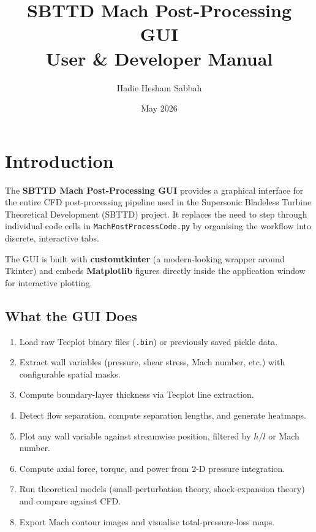 \documentclass[11pt,letterpaper]{article}
\title{%
  \vspace{-1cm}
  \textbf{SBTTD Mach Post-Processing GUI}\\[6pt]
  \large User \& Developer Manual
}
\author{Hadie Hesham Sabbah}
\date{May 2026}
\begin{document}
\maketitle
\tableofcontents
\newpage

\section{Introduction}

The \textbf{SBTTD Mach Post-Processing GUI} provides a graphical interface for
the entire CFD post-processing pipeline used in the Supersonic Bladeless Turbine
Theoretical Development (SBTTD) project.  It replaces the need to step through
individual code cells in \texttt{MachPostProcessCode.py} by organising the
workflow into discrete, interactive tabs.

The GUI is built with \textbf{customtkinter} (a modern-looking wrapper around
Tkinter) and embeds \textbf{Matplotlib} figures directly inside the application
window for interactive plotting.

\subsection{What the GUI Does}

\begin{enumerate}[leftmargin=2em]
  \item Load raw Tecplot binary files (\texttt{.bin}) or previously saved
        pickle data.
  \item Extract wall variables (pressure, shear stress, Mach number, etc.)
        with configurable spatial masks.
  \item Compute boundary-layer thickness via Tecplot line extraction.
  \item Detect flow separation, compute separation lengths, and generate
        heatmaps.
  \item Plot any wall variable against streamwise position, filtered by
        \(h/l\) or Mach number.
  \item Compute axial force, torque, and power from 2-D pressure integration.
  \item Run theoretical models (small-perturbation theory, shock-expansion
        theory) and compare against CFD.
  \item Export Mach contour images and visualise total-pressure-loss maps.
\end{enumerate}
\end{document}
